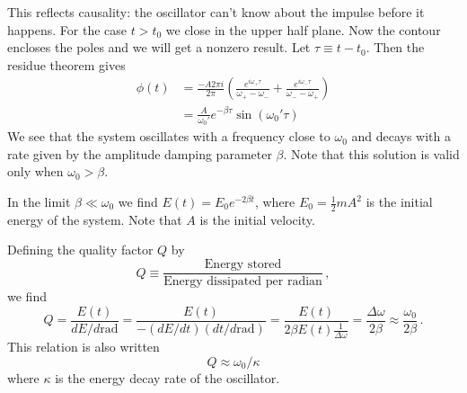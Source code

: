 This reflects causality: the oscillator can't know about the impulse before it happens.
For the case $t > t_{0}$ we close in the upper half plane.
Now the contour encloses the poles and we will get a nonzero result.
Let $\tau \equiv t - t_0$.
Then the residue theorem gives
\begin{align}
  \phi(t) &=
  \frac{-A 2\pi i}{2 \pi}
  \left(
  \frac{e^{i \omega_+ \tau}}{\omega_+ - \omega_-} +
  \frac{e^{i \omega_- \tau}}{\omega_- - \omega_+}
  \right) \\
  &= \frac{A}{\omega_0'} e^{- \beta \tau} \sin(\omega_0' \tau)
\end{align}
We see that the system oscillates with a frequency close to $\omega_0$ and decays with a rate given by the amplitude damping parameter $\beta$.
Note that this solution is valid only when $\omega_0 > \beta$.

In the limit $\beta \ll \omega_0$ we find $E(t) = E_{0}e^{-2 \beta t}$, where $E_0=\frac{1}{2} m A^{2}$ is the initial energy of the system.
Note that $A$ is the initial velocity.

Defining the quality factor $Q$ by
\begin{equation}
  Q \equiv \frac{\textrm{Energy stored}}{\textrm{Energy dissipated per radian}} \, ,
\end{equation}
we find
\begin{equation}
  Q
  = \frac{E(t)}{dE/d\textrm{rad}}
  = \frac{E(t)}{-(dE/dt)(dt/d\textrm{rad})}
  = \frac{E(t)}{2\beta E(t)\frac{1}{\Delta\omega}}
  = \frac{\Delta\omega}{2\beta}\approx\frac{\omega_{0}}{2\beta} \, .
\end{equation}
This relation is also written
\begin{equation}
  Q \approx \omega_0 / \kappa
\end{equation}
where $\kappa$ is the energy decay rate of the oscillator.

